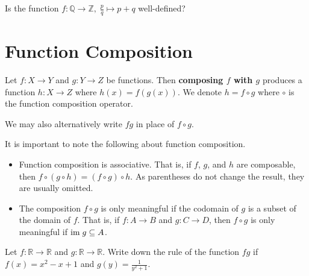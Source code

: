 \begin{exercise}
    Is the function $f: \mathbb{Q} \to \mathbb{Z},\;\frac pq \mapsto p + q$ well-defined?
\end{exercise}

\section{Function Composition}
\begin{definition}
    Let $f: X \to Y$ and $g: Y \to Z$ be functions. Then \textbf{composing $f$ with $g$} produces a function $h: X \to Z$ where $h(x) = f(g(x))$. We denote $h = f \circ g$ where $\circ$ is the function composition operator.
\end{definition}
\begin{remark}
    We may also alternatively write $fg$ in place of $f \circ g$.
\end{remark}

It is important to note the following about function composition.
\begin{itemize}
    \item Function composition is associative. That is, if $f$, $g$, and $h$ are composable, then $f \circ (g \circ h) = (f \circ g) \circ h$. As parentheses do not change the result, they are usually omitted.
    \item The composition $f \circ g$ is only meaningful if the codomain of $g$ is a subset of the domain of $f$. That is, if $f: A \to B$ and $g: C \to D$, then $f \circ g$ is only meaningful if $\mathrm{im}\; g \subseteq A$.
\end{itemize}

\begin{exercise}
    Let $f: \mathbb{R} \to \mathbb{R}$ and $g: \mathbb{R} \to \mathbb{R}$. Write down the rule of the function $fg$ if $f(x) = x^2 - x + 1$ and $g(y) = \frac1{y^2+1}$.
\end{exercise}

